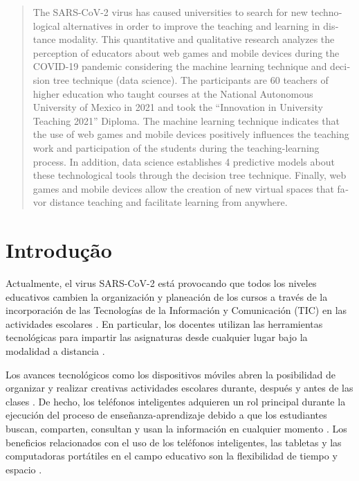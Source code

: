 \documentclass[spanish]{textolivre}
\begin{document}
\begin{polyabstract}
\begin{portuguese}
\begin{abstract}
\end{abstract}
\end{portuguese}

\begin{english}
\begin{abstract}
The SARS-CoV-2 virus has caused universities to search for new technological alternatives in order to improve the teaching and learning in distance modality. This quantitative and qualitative research analyzes the perception of educators about web games and mobile devices during the COVID-19 pandemic considering the machine learning technique and decision tree technique (data science). The participants are 60 teachers of higher education who taught courses at the National Autonomous University of Mexico in 2021 and took the “Innovation in University Teaching 2021” Diploma. The machine learning technique indicates that the use of web games and mobile devices positively influences the teaching work and participation of the students during the teaching-learning process. In addition, data science establishes 4 predictive models about these technological tools through the decision tree technique. Finally, web games and mobile devices allow the creation of new virtual spaces that favor distance teaching and facilitate learning from anywhere.

\end{abstract}
\end{english}
\end{polyabstract}

\section{Introdução}\label{sec-intro}
Actualmente, el virus SARS-CoV-2 está provocando que todos los niveles educativos cambien la organización y planeación de los cursos a través de la incorporación de las Tecnologías de la Información y Comunicación (TIC) en las actividades escolares \cite{maphosa2021, maggio2020, ramirez-montoya2020}. En particular, los docentes utilizan las herramientas tecnológicas para impartir las asignaturas desde cualquier lugar bajo la modalidad a distancia \cite{manrique-losada2020, saribas2021}.

Los avances tecnológicos como los dispositivos móviles abren la posibilidad de organizar y realizar creativas actividades escolares durante, después y antes de las clases \cite{gezgin2018, park2020}. De hecho, los teléfonos inteligentes adquieren un rol principal durante la ejecución del proceso de enseñanza-aprendizaje debido a que los estudiantes buscan, comparten, consultan y usan la información en cualquier momento \cite{padmo2019, sumuer2021}. Los beneficios relacionados con el uso de los teléfonos inteligentes, las tabletas y las computadoras portátiles en el campo educativo son la flexibilidad de tiempo y espacio \cite{park2020}.
\end{document}
